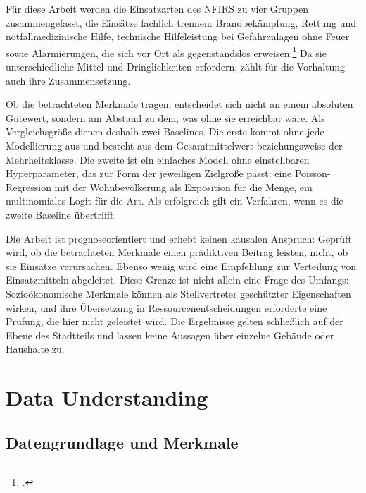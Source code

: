 \documentclass[12pt,a4paper]{article}
\begin{document}
Für diese Arbeit werden die Einsatzarten des NFIRS zu vier Gruppen zusammengefasst, die Einsätze fachlich trennen: Brandbekämpfung, Rettung und notfallmedizinische Hilfe, technische Hilfeleistung bei Gefahrenlagen ohne Feuer sowie Alarmierungen, die sich vor Ort als gegenstandslos erweisen.\footcite[42-48]{USFA2015} Da sie unterschiedliche Mittel und Dringlichkeiten erfordern, zählt für die Vorhaltung auch ihre Zusammensetzung.

Ob die betrachteten Merkmale tragen, entscheidet sich nicht an einem absoluten Gütewert, sondern am Abstand zu dem, was ohne sie erreichbar wäre. Als Vergleichsgröße dienen deshalb zwei Baselines. Die erste kommt ohne jede Modellierung aus und besteht aus dem Gesamtmittelwert beziehungsweise der Mehrheitsklasse. Die zweite ist ein einfaches Modell ohne einstellbaren Hyperparameter, das zur Form der jeweiligen Zielgröße passt: eine Poisson-Regression mit der Wohnbevölkerung als Exposition für die Menge, ein multinomiales Logit für die Art. Als erfolgreich gilt ein Verfahren, wenn es die zweite Baseline übertrifft.

Die Arbeit ist prognoseorientiert und erhebt keinen kausalen Anspruch: Geprüft wird, ob die betrachteten Merkmale einen prädiktiven Beitrag leisten, nicht, ob sie Einsätze verursachen. Ebenso wenig wird eine Empfehlung zur Verteilung von Einsatzmitteln abgeleitet. Diese Grenze ist nicht allein eine Frage des Umfangs: Sozioökonomische Merkmale können als Stellvertreter geschützter Eigenschaften wirken, und ihre Übersetzung in Ressourcenentscheidungen erforderte eine Prüfung, die hier nicht geleistet wird. Die Ergebnisse gelten schließlich auf der Ebene des Stadtteils und lassen keine Aussagen über einzelne Gebäude oder Haushalte zu.


\section{Data Understanding}

\subsection{Datengrundlage und Merkmale}
\label{sec:datengrundlage}
\end{document}
